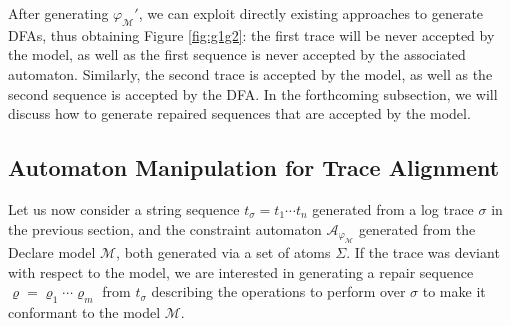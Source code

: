 After generating $\varphi_{\mathcal{M}}'$, we can exploit directly existing approaches \cite{LeoniMA12,Westergaard11,Lydia} to generate DFAs, thus obtaining Figure \ref{fig:g1g2}: the first trace will be never accepted by the model, as well as the first sequence is never accepted by the associated automaton. Similarly, the second trace is accepted by the model, as well as the second sequence is accepted by the DFA. In the forthcoming subsection, we will discuss how to generate repaired sequences that are accepted by the model.

\subsection{Automaton Manipulation for Trace Alignment}\label{ssec:amfta}
Let us now consider a string sequence $t_\sigma=t_1\cdots t_n$ generated from a log trace $\sigma$ in the previous section, and the constraint automaton $\mathcal{A}_{\varphi_{\mathcal{M}}}$ generated from the Declare model $\mathcal{M}$, both generated via a set of atoms $\Sigma$. If the trace was deviant with respect to the model, we are interested in generating a repair sequence $\varrho=\varrho_1\cdots \varrho_m$ from $t_\sigma$ describing the operations to perform over $\sigma$ to make it conformant to the model $\mathcal{M}$.

